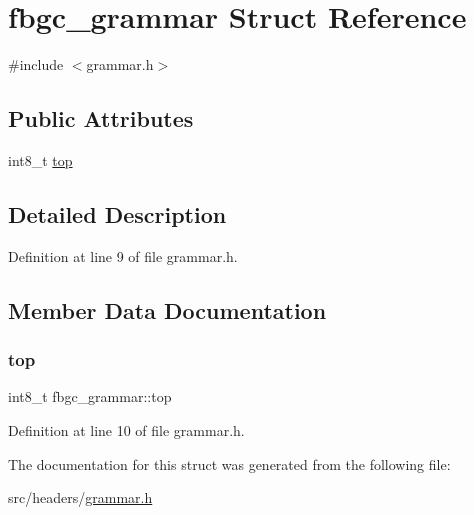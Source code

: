 \hypertarget{structfbgc__grammar}{}\section{fbgc\+\_\+grammar Struct Reference}
\label{structfbgc__grammar}


{\ttfamily \#include $<$grammar.\+h$>$}

\subsection*{Public Attributes}
\begin{DoxyCompactItemize}
\item 
int8\+\_\+t \hyperlink{structfbgc__grammar_ad97b08ad02b2c95f046880b907c34e5e}{top}
\end{DoxyCompactItemize}


\subsection{Detailed Description}


Definition at line 9 of file grammar.\+h.



\subsection{Member Data Documentation}
\mbox{\label{structfbgc__grammar_ad97b08ad02b2c95f046880b907c34e5e}} 
\subsubsection{\texorpdfstring{top}{top}}
{\footnotesize\ttfamily int8\+\_\+t fbgc\+\_\+grammar\+::top}



Definition at line 10 of file grammar.\+h.



The documentation for this struct was generated from the following file\+:\begin{DoxyCompactItemize}
\item 
src/headers/\hyperlink{grammar_8h}{grammar.\+h}\end{DoxyCompactItemize}
